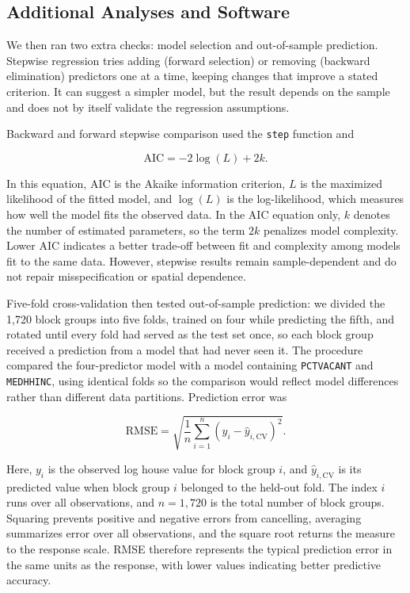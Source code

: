 \documentclass[11pt]{article}
\newcommand{\var}[1]{\texttt{#1}}
\begin{document}
\subsection{Additional Analyses and Software}

We then ran two extra checks: model selection and out-of-sample prediction. Stepwise regression tries adding (forward selection) or removing (backward elimination) predictors one at a time, keeping changes that improve a stated criterion. It can suggest a simpler model, but the result depends on the sample and does not by itself validate the regression assumptions.

Backward and forward stepwise comparison used the \var{step} function and

\begin{equation}
\mathrm{AIC}=-2\log(L)+2k.
\end{equation}

In this equation, $\mathrm{AIC}$ is the Akaike information criterion, $L$ is the maximized likelihood of the fitted model, and $\log(L)$ is the log-likelihood, which measures how well the model fits the observed data. In the AIC equation only, $k$ denotes the number of estimated parameters, so the term $2k$ penalizes model complexity. Lower AIC indicates a better trade-off between fit and complexity among models fit to the same data. However, stepwise results remain sample-dependent and do not repair misspecification or spatial dependence.

Five-fold cross-validation then tested out-of-sample prediction: we divided the 1,720 block groups into five folds, trained on four while predicting the fifth, and rotated until every fold had served as the test set once, so each block group received a prediction from a model that had never seen it. The procedure compared the four-predictor model with a model containing \var{PCTVACANT} and \var{MEDHHINC}, using identical folds so the comparison would reflect model differences rather than different data partitions. Prediction error was

\begin{equation}
\mathrm{RMSE}=\sqrt{\frac{1}{n}\sum_{i=1}^{n}(y_i-\widehat{y}_{i,\mathrm{CV}})^2}.
\end{equation}

Here, $y_i$ is the observed log house value for block group $i$, and $\widehat{y}_{i,\mathrm{CV}}$ is its predicted value when block group $i$ belonged to the held-out fold. The index $i$ runs over all observations, and $n=1{,}720$ is the total number of block groups. Squaring prevents positive and negative errors from cancelling, averaging summarizes error over all observations, and the square root returns the measure to the response scale. RMSE therefore represents the typical prediction error in the same units as the response, with lower values indicating better predictive accuracy.
\end{document}

